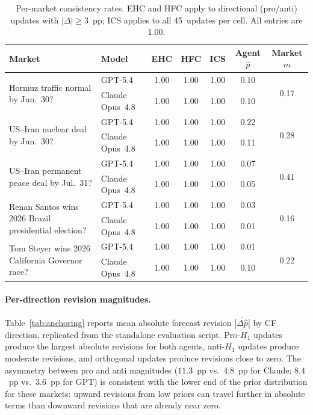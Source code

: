 \begin{table}[h]
\centering
\caption{Per-market consistency rates.  EHC and HFC apply to directional (pro/anti) updates
with $|\Delta| \geq 3$~pp; ICS applies to all 45~updates per cell.  All entries are 1.00.}
\label{tab:per-market}
\small
\begin{tabular}{p{5.5cm} l ccc cc}
\toprule
\textbf{Market} & \textbf{Model} & \textbf{EHC} & \textbf{HFC} & \textbf{ICS}
               & \textbf{Agent} $\hat{p}$ & \textbf{Market} $m$ \\
\midrule
\multirow{2}{5.5cm}{Hormuz traffic normal by Jun.~30?}
 & GPT-5.4         & 1.00 & 1.00 & 1.00 & 0.10 & \multirow{2}{*}{0.17} \\
 & Claude Opus~4.8 & 1.00 & 1.00 & 1.00 & 0.10 & \\
\midrule
\multirow{2}{5.5cm}{US--Iran nuclear deal by Jun.~30?}
 & GPT-5.4         & 1.00 & 1.00 & 1.00 & 0.22 & \multirow{2}{*}{0.28} \\
 & Claude Opus~4.8 & 1.00 & 1.00 & 1.00 & 0.11 & \\
\midrule
\multirow{2}{5.5cm}{US--Iran permanent peace deal by Jul.~31?}
 & GPT-5.4         & 1.00 & 1.00 & 1.00 & 0.07 & \multirow{2}{*}{0.41} \\
 & Claude Opus~4.8 & 1.00 & 1.00 & 1.00 & 0.05 & \\
\midrule
\multirow{2}{5.5cm}{Renan Santos wins 2026 Brazil presidential election?}
 & GPT-5.4         & 1.00 & 1.00 & 1.00 & 0.03 & \multirow{2}{*}{0.16} \\
 & Claude Opus~4.8 & 1.00 & 1.00 & 1.00 & 0.01 & \\
\midrule
\multirow{2}{5.5cm}{Tom Steyer wins 2026 California Governor race?}
 & GPT-5.4         & 1.00 & 1.00 & 1.00 & 0.01 & \multirow{2}{*}{0.22} \\
 & Claude Opus~4.8 & 1.00 & 1.00 & 1.00 & 0.10 & \\
\bottomrule
\end{tabular}
\end{table}

\paragraph{Per-direction revision magnitudes.}
Table~\ref{tab:anchoring} reports mean absolute forecast revision $\overline{|\Delta\hat{p}|}$
by CF direction, replicated from the standalone evaluation script.  Pro-$H_1$ updates produce
the largest absolute revisions for both agents, anti-$H_1$ updates produce moderate revisions,
and orthogonal updates produce revisions close to zero.  The asymmetry between pro and anti
magnitudes ($11.3$~pp vs.\ $4.8$~pp for Claude; $8.4$~pp vs.\ $3.6$~pp for GPT) is consistent
with the lower end of the prior distribution for these markets: upward revisions from low priors
can travel further in absolute terms than downward revisions that are already near zero.

